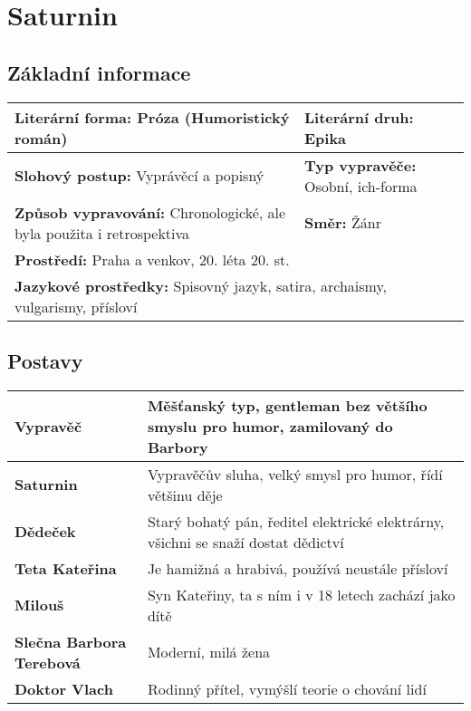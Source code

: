 \section{Saturnin}
\subsection*{Základní informace}
\begin{tabularx}{\linewidth}{l|l}
    \textbf{Literární forma:} Próza (Humoristický román)                         & \textbf{Literární druh:} Epika            \\
    \hline
    \textbf{Slohový postup:} Vyprávěcí a popisný                                 & \textbf{Typ vypravěče:} Osobní, ich-forma \\
    \hline
    \textbf{Způsob vypravování:} Chronologické, ale byla použita i retrospektiva & \textbf{Směr:} Žánr                       \\
    \hline
    \multicolumn{2}{l}{\textbf{Prostředí:} Praha a venkov, 20. léta 20. st.}                                                 \\
    \hline
    \multicolumn{2}{l}{\textbf{Jazykové prostředky:} Spisovný jazyk, satira, archaismy, vulgarismy, přísloví}                \\
\end{tabularx}
\subsection*{Postavy}
\begin{tabularx}{\linewidth}{l|l}
    \textbf{Vypravěč}                & Měšťanský typ, gentleman bez většího smyslu pro humor, zamilovaný do Barbory      \\
    \hline
    \textbf{Saturnin}                & Vypravěčův sluha, velký smysl pro humor, řídí většinu děje                        \\
    \hline
    \textbf{Dědeček}                 & Starý bohatý pán, ředitel elektrické elektrárny, všichni se snaží dostat dědictví \\
    \hline
    \textbf{Teta Kateřina}           & Je hamižná a hrabivá, používá neustále přísloví                                   \\
    \hline
    \textbf{Milouš}                  & Syn Kateřiny, ta s ním i v 18 letech zachází jako dítě                            \\
    \hline
    \textbf{Slečna Barbora Terebová} & Moderní, milá žena                                                                \\
    \hline
    \textbf{Doktor Vlach}            & Rodinný přítel, vymýšlí teorie o chování lidí                                     \\
    \hline
\end{tabularx}
